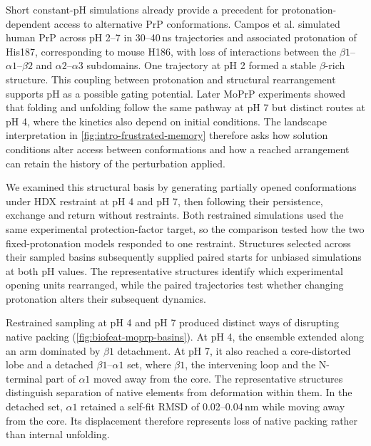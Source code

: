Short constant-pH simulations already provide a precedent for protonation-dependent access to alternative PrP conformations. Campos et al. simulated human PrP across pH 2--7 in 30--40\,ns trajectories and associated protonation of His187, corresponding to mouse H186, with loss of interactions between the $\beta1$--$\alpha1$--$\beta2$ and $\alpha2$--$\alpha3$ subdomains. One trajectory at pH 2 formed a stable $\beta$-rich structure.\supercite{camposConstantpHMolecularDynamics2010} This coupling between protonation and structural rearrangement supports pH as a possible gating potential. Later MoPrP experiments showed that folding and unfolding follow the same pathway at pH 7 but distinct routes at pH 4, where the kinetics also depend on initial conditions.\supercite{moulickRuggednessFreeEnergy2019} The landscape interpretation in \cref{fig:intro-frustrated-memory} therefore asks how solution conditions alter access between conformations and how a reached arrangement can retain the history of the perturbation applied.

We examined this structural basis by generating partially opened conformations under HDX restraint at pH 4 and pH 7, then following their persistence, exchange and return without restraints. Both restrained simulations used the same experimental protection-factor target, so the comparison tested how the two fixed-protonation models responded to one restraint. Structures selected across their sampled basins subsequently supplied paired starts for unbiased simulations at both pH values. The representative structures identify which experimental opening units rearranged, while the paired trajectories test whether changing protonation alters their subsequent dynamics.

Restrained sampling at pH 4 and pH 7 produced distinct ways of disrupting native packing (\cref{fig:biofeat-moprp-basins}). At pH 4, the ensemble extended along an arm dominated by $\beta1$ detachment. At pH 7, it also reached a core-distorted lobe and a detached $\beta1$--$\alpha1$ set, where $\beta1$, the intervening loop and the N-terminal part of $\alpha1$ moved away from the core. The representative structures distinguish separation of native elements from deformation within them. In the detached set, $\alpha1$ retained a self-fit RMSD of 0.02--0.04\,nm while moving away from the core. Its displacement therefore represents loss of native packing rather than internal unfolding.

